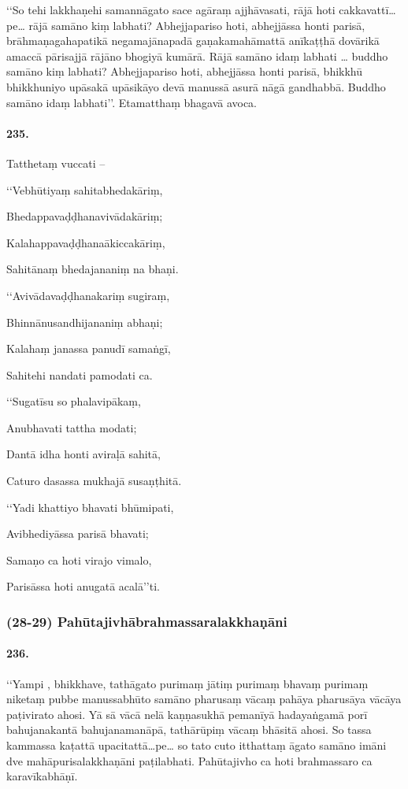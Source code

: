 ‘‘So tehi lakkhaṇehi samannāgato sace agāraṃ ajjhāvasati, rājā hoti cakkavattī…pe… rājā samāno kiṃ labhati? Abhejjapariso hoti, abhejjāssa honti parisā, brāhmaṇagahapatikā negamajānapadā gaṇakamahāmattā anīkaṭṭhā dovārikā amaccā pārisajjā rājāno bhogiyā kumārā. Rājā samāno idaṃ labhati … buddho samāno kiṃ labhati? Abhejjapariso hoti, abhejjāssa honti parisā, bhikkhū bhikkhuniyo upāsakā upāsikāyo devā manussā asurā nāgā gandhabbā. Buddho samāno idaṃ labhati’’. Etamatthaṃ bhagavā avoca.

\paragraph{235.} Tatthetaṃ vuccati –

‘‘Vebhūtiyaṃ sahitabhedakāriṃ,

Bhedappavaḍḍhanavivādakāriṃ;

Kalahappavaḍḍhanaākiccakāriṃ,

Sahitānaṃ bhedajananiṃ na bhaṇi.

‘‘Avivādavaḍḍhanakariṃ sugiraṃ,

Bhinnānusandhijananiṃ abhaṇi;

Kalahaṃ janassa panudī samaṅgī,

Sahitehi nandati pamodati ca.

‘‘Sugatīsu so phalavipākaṃ,

Anubhavati tattha modati;

Dantā idha honti aviraḷā sahitā,

Caturo dasassa mukhajā susaṇṭhitā.

‘‘Yadi khattiyo bhavati bhūmipati,

Avibhediyāssa parisā bhavati;

Samaṇo ca hoti virajo vimalo,

Parisāssa hoti anugatā acalā’’ti.

\subsubsection{(28-29) Pahūtajivhābrahmassaralakkhaṇāni}

\paragraph{236.} ‘‘Yampi , bhikkhave, tathāgato purimaṃ jātiṃ purimaṃ bhavaṃ purimaṃ niketaṃ pubbe manussabhūto samāno pharusaṃ vācaṃ pahāya pharusāya vācāya paṭivirato ahosi. Yā sā vācā nelā kaṇṇasukhā pemanīyā hadayaṅgamā porī bahujanakantā bahujanamanāpā, tathārūpiṃ vācaṃ bhāsitā ahosi. So tassa kammassa kaṭattā upacitattā…pe… so tato cuto itthattaṃ āgato samāno imāni dve mahāpurisalakkhaṇāni paṭilabhati. Pahūtajivho ca hoti brahmassaro ca karavīkabhāṇī.

